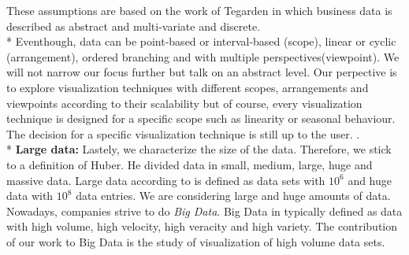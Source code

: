 These assumptions are based on the work of Tegarden in which business data is described as abstract and multi-variate and discrete\cite{Tegarden1999}.
\\*
Eventhough, data can be point-based or interval-based (scope), linear or cyclic (arrangement), ordered branching and with multiple perspectives(viewpoint)\cite{Aigner2011}. We will not narrow our focus further but talk on an abstract level. Our perpective is to explore visualization techniques with different scopes, arrangements and viewpoints according to their scalability but of course, every visualization technique is designed for a specific scope such as linearity or seasonal behaviour. The decision for a specific visualization technique is still up to the user. .\\*
\textbf{Large data:} Lastely, we characterize the size of the data. Therefore, we stick to a definition of Huber. He divided data in small, medium, large, huge and massive data. Large data according to\cite{Huber1994} is defined as data sets with $10^6$ and huge data with $10^8$ data entries. We are considering large and huge amounts of data. Nowadays, companies strive to do \textit{Big Data}. Big Data in typically defined as data with  high volume, high velocity, high veracity and high variety\cite{Wang2015}. The contribution of our work to Big Data is the study of visualization of high volume data sets.



